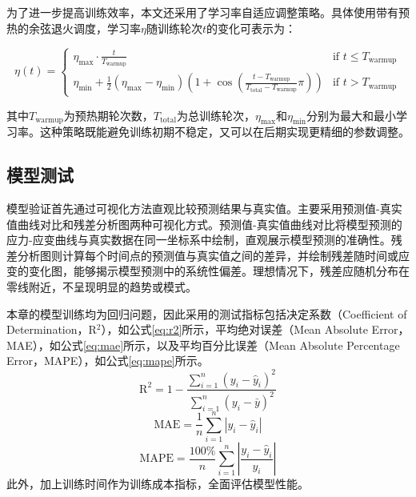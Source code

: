 为了进一步提高训练效率，本文还采用了学习率自适应调整策略。具体使用带有预热的余弦退火调度，学习率$\eta$随训练轮次$t$的变化可表示为：

\begin{equation}
  \eta(t) = \begin{cases}
    \eta_{\text{max}} \cdot \frac{t}{T_{\text{warmup}}}                                                                                             & \text{if } t \leq T_{\text{warmup}} \\
    \eta_{\text{min}} + \frac{1}{2}(\eta_{\text{max}}-\eta_{\text{min}})(1+\cos(\frac{t-T_{\text{warmup}}}{T_{\text{total}}-T_{\text{warmup}}}\pi)) & \text{if } t > T_{\text{warmup}}
  \end{cases}
\end{equation}

其中$T_{\text{warmup}}$为预热期轮次数，$T_{\text{total}}$为总训练轮次，$\eta_{\text{max}}$和$\eta_{\text{min}}$分别为最大和最小学习率。这种策略既能避免训练初期不稳定，又可以在后期实现更精细的参数调整。


\subsection{模型测试} \label{sec:metrics}
模型验证首先通过可视化方法直观比较预测结果与真实值。主要采用预测值-真实值曲线对比和残差分析图两种可视化方式。预测值-真实值曲线对比将模型预测的应力-应变曲线与真实数据在同一坐标系中绘制，直观展示模型预测的准确性。残差分析图则计算每个时间点的预测值与真实值之间的差异，并绘制残差随时间或应变的变化图，能够揭示模型预测中的系统性偏差。理想情况下，残差应随机分布在零线附近，不呈现明显的趋势或模式。

本章的模型训练均为回归问题，因此采用的测试指标包括决定系数（Coefficient of Determination，R$^2$），如公式\eqref{eq:r2}所示，平均绝对误差（Mean Absolute Error，MAE），如公式\eqref{eq:mae}所示，以及平均百分比误差（Mean Absolute Percentage Error，MAPE），如公式\eqref{eq:mape}所示。
\begin{equation}
  \text{R}^2 = 1 - \frac{\sum_{i=1}^{n} (y_i - \hat{y}_i)^2}{\sum_{i=1}^{n} (y_i - \bar{y})^2} \label{eq:r2}
\end{equation}
\begin{equation}
  \text{MAE} = \frac{1}{n} \sum_{i=1}^{n} |y_i - \hat{y}_i| \label{eq:mae}
\end{equation}
\begin{equation}
  \text{MAPE} = \frac{100\%}{n} \sum_{i=1}^{n} \left| \frac{y_i - \hat{y}_i}{y_i} \right| \label{eq:mape}
\end{equation}
此外，加上训练时间作为训练成本指标，全面评估模型性能。


